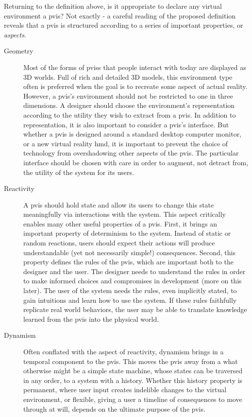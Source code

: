 Returning to the definition above, is it appropriate to
declare any virtual environment a \gls{pvis}? Not exactly - a careful
reading of the proposed definition reveals that a \gls{pvis} is
structured according to a series of important properties, or \textit{aspects}.

\begin{description}
\item[Geometry] Most of the forms of \glspl{pvis} that people interact
  with today are displayed as 3D worlds. Full of rich and detailed 3D
  models, this environment type often is preferred when the goal is to
  recreate some aspect of actual reality. However, a \gls{pvis}'s
  environment should not be restricted to one in three dimensions. A
  designer should choose the environment's representation according to
  the utility they wish to extract from a \gls{pvis}. In addition to
  representation, it is also important to consider a \gls{pvis}'s
  interface. But whether a \gls{pvis} is designed around a standard
  desktop computer monitor, or a new virtual reality \gls{hmd}, it is
  important to prevent the choice of technology from overshadowing
  other aspects of the \gls{pvis}. The particular interface should be
  chosen with care in order to augment, not detract from, the utility of
  the system for its users.

\item[Reactivity] A \gls{pvis} should hold state and allow its
  users to change this state meaningfully via interactions with the system. This
  aspect critically enables many other useful properties of a
  \gls{pvis}. First, it brings an important property of determinism
  to the system. Instead of static or random reactions, users should
  expect their actions will produce understandable (yet not
  necessarily simple!) consequences. Second, this property defines the rules of
  the \gls{pvis}, which are important both to the designer and the
  user. The designer needs to understand the rules in order to make
  informed choices and compromises in development (more on this
  later). The user of the system needs the rules, even implicitly
  stated, to gain intuitions and learn how to use the system. If these
  rules faithfully replicate real world behaviors, the user may be
  able to translate knowledge learned from the \gls{pvis} into the
  physical world.
  
\item[Dynamism] Often conflated with the aspect of reactivity, dynamism
  brings in a temporal component to the \gls{pvis}. This moves the \gls{pvis} away
  from a what otherwise might be a simple state machine, whose states
  can be traversed in any order, to a system with a history. Whether
  this history property is permanent, where user input creates
  indelible changes to the virtual environment, or flexible, giving a
  user a timeline of consequences to move through at will, depends on the
  ultimate purpose of the \gls{pvis}. 


\end{description}
